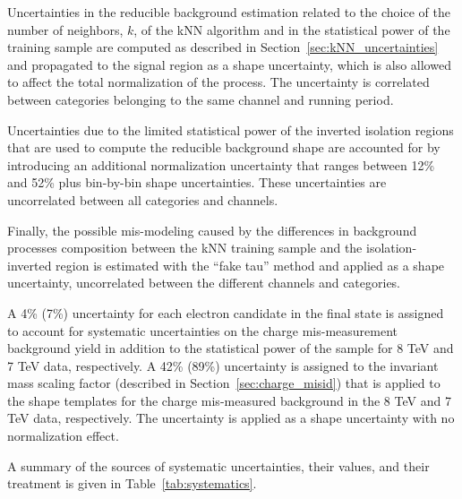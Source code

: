 Uncertainties in the reducible background estimation related to the choice of the number of neighbors, $k$, of the kNN algorithm and in the statistical power of the training sample are computed as described in Section~\ref{sec:kNN_uncertainties} and propagated to the signal region as a shape uncertainty, which is also allowed to affect the total normalization of the process. The uncertainty is correlated between categories belonging to the same channel and running period.

Uncertainties due to the limited statistical power of the inverted isolation regions that are used to compute the reducible background shape are accounted for by introducing an additional normalization uncertainty that ranges between 12\% and 52\% plus bin-by-bin shape uncertainties. These uncertainties are uncorrelated between all categories and channels.

Finally, the possible mis-modeling caused by the differences in background processes composition between the kNN training sample and the isolation-inverted region is estimated with the ``fake tau'' method and applied as a shape uncertainty, uncorrelated between the different channels and categories.

A 4\% (7\%) uncertainty for each electron candidate in the final state is assigned to account for systematic uncertainties on the charge mis-measurement background yield in addition to the statistical power of the sample for 8 TeV and 7 TeV data, respectively. A 42\% (89\%) uncertainty is assigned to the invariant mass scaling factor (described in Section~\ref{sec:charge_misid}) that is applied to the shape templates for the charge mis-measured background in the 8 TeV and 7 TeV data, respectively. The uncertainty is applied as a shape uncertainty with no normalization effect. %

A summary of the sources of systematic uncertainties, their values, and their treatment is given in Table~\ref{tab:systematics}.


